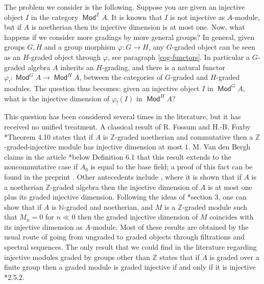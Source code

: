 \documentclass[11pt,fleqn]{article}
\newcommand\NN{\mathbb N}
\newcommand\ZZ{\mathbb Z}
\renewcommand\to{\longrightarrow}
\renewcommand\phi{\varphi}
\DeclareMathOperator\Mod{\mathsf{Mod}}
\begin{document}
The problem we consider is the following. Suppose you are given an injective 
object $I$ in the category $\Mod^\ZZ A$. It is known that $I$ is not 
injective as $A$-module, but if $A$ is noetherian then 
its injective dimension is at most one. Now, what happens if we consider more 
gradings by more general groups? In general, given groups $G, H$ and 
a group morphism $\phi: G \to H$, any $G$-graded object can be seen as an 
$H$-graded object through $\phi$, see paragraph \ref{cog-functors}. In 
particular a $G$-graded algebra $A$ inherits an $H$-grading, and there is a 
natural functor $\phi_!: \Mod^G A \to \Mod^H A$, between the categories of 
$G$-graded and $H$-graded modules. The question thus becomes: given an 
injective object $I$ in $\Mod^G A$, what is the injective dimension of 
$\phi_!(I)$ in $\Mod^H A$?

This question has been considered several times in the literature, but it has 
received no unified treatment. A classical result of R. Fossum and H.-B. Foxby 
\cite{FF-graded}*{Theorem 4.10} states that if $A$ is $\ZZ$-graded noetherian 
and commutative then a $\ZZ$-graded-injective module has injective dimension 
at most $1$. M. Van den Bergh claims in the article 
\cite{VdB-existence-dc}*{below Definition 6.1} that this result extends to the 
noncommutative case if $A_0$ is equal to the base field; a proof of this fact 
can be found in the preprint \cite{Yek-note}. Other antecedents include 
\cite{Eks-auslander}, where it is shown that if $A$ is a noetherian 
$\ZZ$-graded algebra then the injective dimension of $A$ is at most one plus 
its graded injective dimension. Following the ideas of 
\cite{Lev-ncreg}*{section 3}, one can show that if $A$ is $\NN$-graded and 
noetherian, and $M$ is a $\ZZ$-graded module such that $M_n = 0$ for $n \ll 0$ 
then the graded injective dimension of $M$ coincides with its injective 
dimension as $A$-module. Most of these results are obtained by the usual route 
of going from ungraded to graded objects through filtrations and spectral 
sequences. The only result that we could find in the literature regarding 
injective modules graded by groups other than $\ZZ$ states that if $A$
is graded over a finite group then a graded module is graded injective if and 
only if it is injective \cite{NV-graded-book3}*{2.5.2}. 
\end{document}
